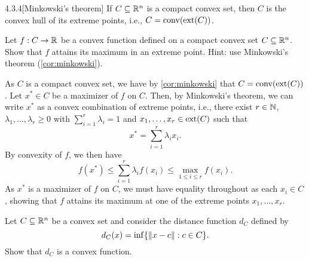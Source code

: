 \begin{manualcorollary}{4.3.4}[Minkowski's theorem]\label{cor:minkowski}
  If $C \subseteq \mathbb{R}^n$ is a compact convex set, then $C$ is the convex hull of its extreme points, i.e., $C = \operatorname*{conv}(\operatorname*{ext}(C))$.
\end{manualcorollary}

\begin{exercise}
  Let $f : C \to \mathbb{R}$ be a convex function defined on a compact convex set $C \subseteq \mathbb{R}^n$.
  Show that $f$ attains its maximum in an extreme point.
  Hint: use Minkowski's theorem (\cref{cor:minkowski}).
\end{exercise}

\begin{solution}
  As $C$ is a compact convex set, we have by \cref{cor:minkowski} that $C = \operatorname*{conv}(\operatorname*{ext}(C))$.
  Let $x^* \in C$ be a maximizer of $f$ on $C$.
  Then, by Minkowski's theorem, we can write $x^*$ as a convex combination of extreme points, i.e., there exist $r \in \mathbb{N}$, $\lambda_1, \ldots, \lambda_r \geq 0$ with $\sum_{i=1}^r \lambda_i = 1$ and $x_1, \ldots, x_r \in \operatorname*{ext}(C)$ such that
  \begin{equation}
    x^* = \sum_{i=1}^r \lambda_i x_i.
  \end{equation}
  By convexity of $f$, we then have
  \begin{equation}
    f(x^*)
    \leq
    \sum_{i=1}^r \lambda_i f(x_i)
    \leq
    \max_{1 \leq i \leq r} f(x_i).
  \end{equation}
  As $x^*$ is a maximizer of $f$ on $C$, we must have equality throughout as each $x_i \in C$, showing that $f$ attains its maximum at one of the extreme points $x_1, \ldots, x_r$.
\end{solution}

\begin{exercise}
  Let $C \subseteq \mathbb{R}^n$ be a convex set and consider the distance function $d_C$ defined by
  \begin{equation}
    d_C(x) = \inf\{ \lVert x - c\rVert : c \in C \}.
  \end{equation}
  Show that $d_C$ is a convex function.
\end{exercise}


